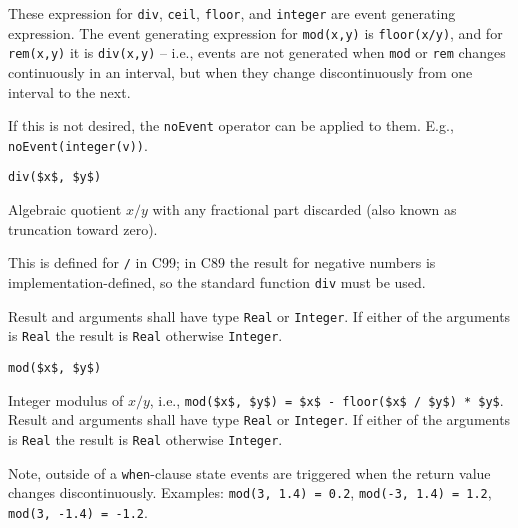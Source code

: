 These expression for \lstinline!div!, \lstinline!ceil!, \lstinline!floor!, and \lstinline!integer! are event generating expression.
The event generating expression for \lstinline!mod(x,y)! is \lstinline!floor(x/y)!, and for \lstinline!rem(x,y)! it is \lstinline!div(x,y)! -- i.e., events are not generated when \lstinline!mod! or \lstinline!rem! changes continuously in an interval, but when they change discontinuously from one interval to the next.

\begin{nonnormative}
If this is not desired, the \lstinline!noEvent! operator can be applied to them.
E.g., \lstinline!noEvent(integer(v))!.
\end{nonnormative}

\begin{operatordefinition}[div]
\begin{synopsis}\begin{lstlisting}
div($x$, $y$)
\end{lstlisting}\end{synopsis}
\begin{semantics}
Algebraic quotient $x / y$ with any fractional part discarded (also known as truncation toward zero).
\begin{nonnormative}
This is defined for \lstinline!/! in C99; in C89 the result for negative numbers is implementation-defined, so the standard function \lstinline[language=C]!div! must be used.
\end{nonnormative}
Result and arguments shall have type \lstinline!Real! or \lstinline!Integer!.
If either of the arguments is \lstinline!Real! the result is \lstinline!Real! otherwise \lstinline!Integer!.
\end{semantics}
\end{operatordefinition}

\begin{operatordefinition}[mod]
\begin{synopsis}\begin{lstlisting}
mod($x$, $y$)
\end{lstlisting}\end{synopsis}
\begin{semantics}
Integer modulus of $x / y$, i.e., \lstinline!mod($x$, $y$) = $x$ - floor($x$ / $y$) * $y$!.
Result and arguments shall have type \lstinline!Real! or \lstinline!Integer!.
If either of the arguments is \lstinline!Real! the result is \lstinline!Real! otherwise \lstinline!Integer!.
\begin{nonnormative}
Note, outside of a \lstinline!when!-clause state events are triggered when the return value changes discontinuously.
Examples: \lstinline!mod(3, 1.4) = 0.2!, \lstinline!mod(-3, 1.4) = 1.2!, \lstinline!mod(3, -1.4) = -1.2!.
\end{nonnormative}
\end{semantics}
\end{operatordefinition}

